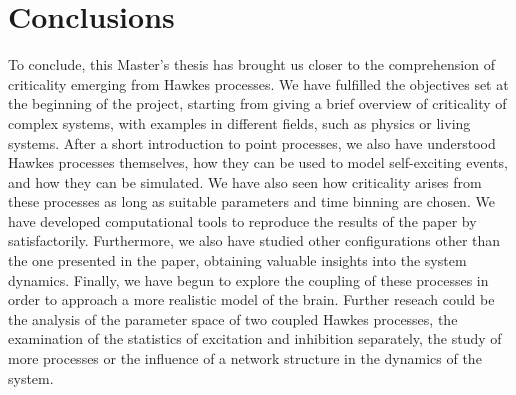 \chapter{Conclusions}\label{ch:conclusiones}

To conclude, this Master's thesis has brought us closer to the comprehension of criticality emerging from Hawkes processes. We have fulfilled the objectives set at the beginning of the project, 
starting from giving a brief overview of criticality of complex systems, with examples in different fields, such as physics or living systems. After a short introduction to point processes,
we also have understood Hawkes processes themselves, how they can be used to model self-exciting events, and how they can be simulated. We have also seen how criticality arises from 
these processes as long as suitable parameters and time binning are chosen. We have developed computational tools to reproduce the results of the paper by \cite{notarmuzi2021percolation} 
satisfactorily. Furthermore, we also have studied other configurations other than the one presented in the paper, obtaining valuable insights into the system dynamics. Finally, we have 
begun to explore the coupling of these processes in order to approach a more realistic model of the brain. Further reseach could be the analysis of the parameter space of two coupled
Hawkes processes, the examination of the statistics of excitation and inhibition separately, the study of more processes or the influence of a network structure in the dynamics of the system.  
